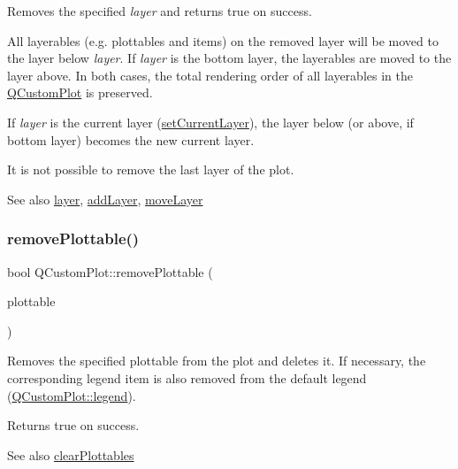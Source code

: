 Removes the specified {\itshape layer} and returns true on success.

All layerables (e.\+g. plottables and items) on the removed layer will be moved to the layer below {\itshape layer}. If {\itshape layer} is the bottom layer, the layerables are moved to the layer above. In both cases, the total rendering order of all layerables in the \hyperlink{classQCustomPlot}{Q\+Custom\+Plot} is preserved.

If {\itshape layer} is the current layer (\hyperlink{classQCustomPlot_a73a6dc47c653bb6f8f030abca5a11852}{set\+Current\+Layer}), the layer below (or above, if bottom layer) becomes the new current layer.

It is not possible to remove the last layer of the plot.

\begin{DoxySeeAlso}{See also}
\hyperlink{classQCustomPlot_a0a96244e7773b242ef23c32b7bdfb159}{layer}, \hyperlink{classQCustomPlot_ad5255393df078448bb6ac83fa5db5f52}{add\+Layer}, \hyperlink{classQCustomPlot_ae896140beff19424e9e9e02d6e331104}{move\+Layer} 
\end{DoxySeeAlso}
\mbox{\label{classQCustomPlot_af3dafd56884208474f311d6226513ab2}} 
\subsubsection{\texorpdfstring{remove\+Plottable()}{removePlottable()}\hspace{0.1cm}{\footnotesize\ttfamily [1/2]}}
{\footnotesize\ttfamily bool Q\+Custom\+Plot\+::remove\+Plottable (\begin{DoxyParamCaption}\item[{\hyperlink{classQCPAbstractPlottable}{Q\+C\+P\+Abstract\+Plottable} $\ast$}]{plottable }\end{DoxyParamCaption})}

Removes the specified plottable from the plot and deletes it. If necessary, the corresponding legend item is also removed from the default legend (\hyperlink{classQCustomPlot_a4eadcd237dc6a09938b68b16877fa6af}{Q\+Custom\+Plot\+::legend}).

Returns true on success.

\begin{DoxySeeAlso}{See also}
\hyperlink{classQCustomPlot_a9a409bb3201878adb7ffba1c89c4e004}{clear\+Plottables} 
\end{DoxySeeAlso}
\mbox{\label{classQCustomPlot_afc210e0021480f8119bccf37839dbcc8}} 
